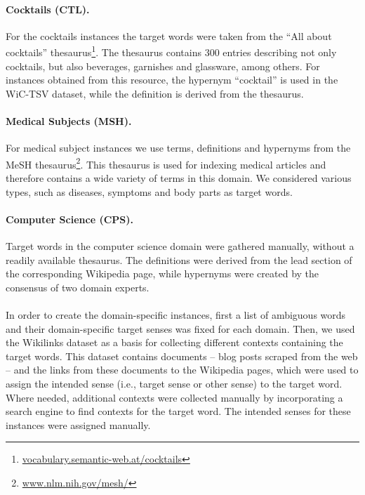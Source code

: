 \documentclass[11pt,a4paper]{article}
\begin{document}
\paragraph{Cocktails (CTL).}
For the cocktails instances the target words were taken from the ``All about cocktails'' thesaurus\footnote{\url{vocabulary.semantic-web.at/cocktails}}. The thesaurus contains 300 entries describing not only cocktails, but also beverages, garnishes and glassware, among others. For instances obtained from this resource, the hypernym ``cocktail'' is used in the WiC-TSV dataset, while the definition is derived from the thesaurus.

\paragraph{Medical Subjects (MSH).}
For medical subject instances we use terms, definitions and hypernyms from the MeSH  thesaurus\footnote{\url{www.nlm.nih.gov/mesh/}}. This thesaurus is used for indexing medical articles and therefore contains a wide variety of terms in this domain. 
We considered various types, such as diseases, symptoms and body parts as target words.

\paragraph{Computer Science (CPS).}
Target words in the computer science domain were gathered manually, without a readily available thesaurus. The definitions were derived from the lead section of the corresponding Wikipedia page, while hypernyms were created by the consensus of two domain experts.
\paragraph{}

In order to create the domain-specific instances, first a list of ambiguous words and their domain-specific target senses was fixed for each domain. Then, we used the Wikilinks dataset \cite{singh12:wiki-links} as a basis for collecting different contexts containing the target words.
This dataset contains documents -- blog posts scraped from the web -- and the links from these documents to the Wikipedia pages, which were used to assign the intended sense (i.e., target sense or other sense) to the target word.
Where needed, additional contexts were collected manually by incorporating a search engine to find contexts for the target word. The intended senses for these instances were assigned manually.
\end{document}
